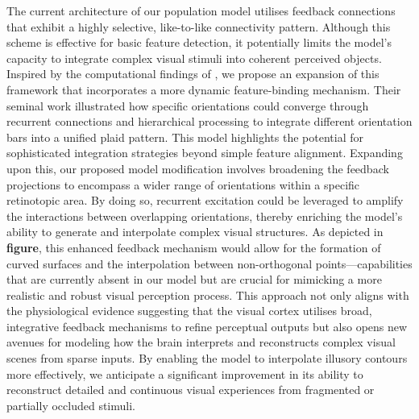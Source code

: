 \documentclass[12pt]{article}
\begin{document}
\bigbreak
The current architecture of our population model utilises feedback connections that exhibit a highly selective, like-to-like connectivity pattern. Although this scheme is effective for basic feature detection, it potentially limits the model's capacity to integrate complex visual stimuli into coherent perceived objects. Inspired by the computational findings of \textcite{muirSpecificExcitatoryConnectivity2017}, we propose an expansion of this framework that incorporates a more dynamic feature-binding mechanism. Their seminal work illustrated how specific orientations could converge through recurrent connections and hierarchical processing to integrate different orientation bars into a unified plaid pattern. This model highlights the potential for sophisticated integration strategies beyond simple feature alignment.
\bigbreak
Expanding upon this, our proposed model modification involves broadening the feedback projections to encompass a wider range of orientations within a specific retinotopic area. By doing so, recurrent excitation could be leveraged to amplify the interactions between overlapping orientations, thereby enriching the model’s ability to generate and interpolate complex visual structures. As depicted in \textbf{figure}, this enhanced feedback mechanism would allow for the formation of curved surfaces and the interpolation between non-orthogonal points—capabilities that are currently absent in our model but are crucial for mimicking a more realistic and robust visual perception process. This approach not only aligns with the physiological evidence suggesting that the visual cortex utilises broad, integrative feedback mechanisms to refine perceptual outputs but also opens new avenues for modeling how the brain interprets and reconstructs complex visual scenes from sparse inputs. By enabling the model to interpolate illusory contours more effectively, we anticipate a significant improvement in its ability to reconstruct detailed and continuous visual experiences from fragmented or partially occluded stimuli. 
\end{document}
